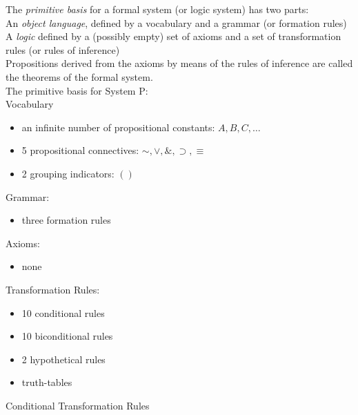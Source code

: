 \documentclass[11pt, fleqn]{article}
\begin{document}
The \textit{primitive basis} for a formal system (or logic system)
 has two parts:\\
 An \textit{object language}, defined by a vocabulary and a grammar (or formation rules)\\
 A \textit{logic} defined by a (possibly empty) set of axioms and a set of transformation rules (or rules of inference)\\
 Propositions derived from the axioms by means of the rules of inference are called the theorems of the formal system.\\
 
 The primitive basis for System P:\\
 Vocabulary
 \begin{itemize}
     \item an infinite number of propositional constants: $A,B,C,\ldots$
     \item 5 propositional connectives: $\sim,\vee,\&,\supset,\equiv$
     \item 2 grouping indicators: $()$
 \end{itemize}
 Grammar:
 \begin{itemize}
     \item three formation rules
 \end{itemize}
 Axioms:
 \begin{itemize}
     \item none
 \end{itemize}
 Transformation Rules:
 \begin{itemize}
     \item 10 conditional rules
     \item 10 biconditional rules
     \item 2 hypothetical rules
     \item truth-tables
 \end{itemize}
 Conditional Transformation Rules
\end{document}
